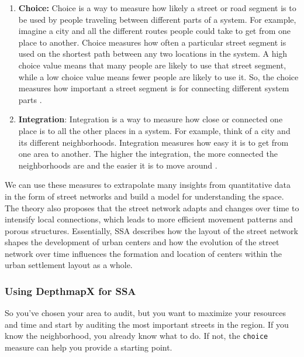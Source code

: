 \documentclass[
]{latex/krantz}
\begin{document}
\begin{enumerate}
\def\labelenumi{\arabic{enumi}.}
\item
  \textbf{Choice:} Choice is a way to measure how likely a street or road segment is to be used by people traveling between different parts of a system. For example, imagine a city and all the different routes people could take to get from one place to another. Choice measures how often a particular street segment is used on the shortest path between any two locations in the system. A high choice value means that many people are likely to use that street segment, while a low choice value means fewer people are likely to use it. So, the choice measures how important a street segment is for connecting different system parts \autocite{hillierSocialLogicSpace1984}.
\item
  \textbf{Integration}: Integration is a way to measure how close or connected one place is to all the other places in a system. For example, think of a city and its different neighborhoods. Integration measures how easy it is to get from one area to another. The higher the integration, the more connected the neighborhoods are and the easier it is to move around \autocite{hillierSocialLogicSpace1984}.
\end{enumerate}

We can use these measures to extrapolate many insights from quantitative data in the form of street networks and build a model for understanding the space. The theory also proposes that the street network adapts and changes over time to intensify local connections, which leads to more efficient movement patterns and porous structures. Essentially, SSA describes how the layout of the street network shapes the development of urban centers and how the evolution of the street network over time influences the formation and location of centers within the urban settlement layout as a whole.

\hypertarget{using-depthmapx-for-ssa}{%
\subsubsection{Using DepthmapX for SSA}\label{using-depthmapx-for-ssa}}

So you've chosen your area to audit, but you want to maximize your resources and time and start by auditing the most important streets in the region. If you know the neighborhood, you already know what to do. If not, the \texttt{choice} measure can help you provide a starting point.
\end{document}
